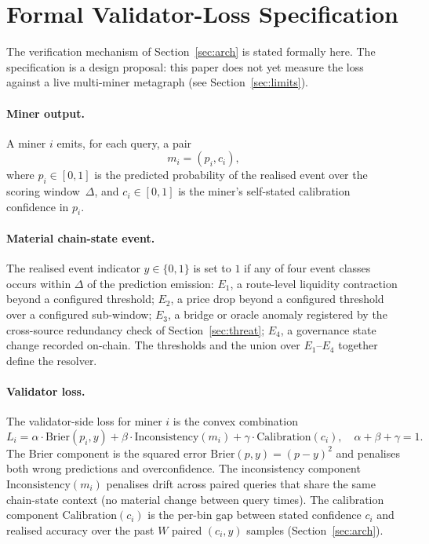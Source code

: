 \documentclass[11pt,a4paper]{article}
\begin{document}
\section{Formal Validator-Loss Specification}\label{sec:formal}\label{sec:formal:vloss}

The verification mechanism of Section~\ref{sec:arch} is stated formally
here. The specification is a design proposal: this paper does not yet
measure the loss against a live multi-miner metagraph (see
Section~\ref{sec:limits}).

\paragraph{Miner output.} A miner $i$ emits, for each query, a pair
\begin{equation}
m_i = (p_i, c_i),
\end{equation}
where $p_i \in [0,1]$ is the predicted probability of the realised event
over the scoring window~$\Delta$, and $c_i \in [0,1]$ is the miner's
self-stated calibration confidence in $p_i$.

\paragraph{Material chain-state event.} The realised event indicator
$y \in \{0,1\}$ is set to $1$ if any of four event classes occurs within
$\Delta$ of the prediction emission: $E_1$, a route-level liquidity
contraction beyond a configured threshold; $E_2$, a price drop beyond a
configured threshold over a configured sub-window; $E_3$, a bridge or
oracle anomaly registered by the cross-source redundancy check of
Section~\ref{sec:threat}; $E_4$, a governance state change recorded
on-chain. The thresholds and the union over $E_1$--$E_4$ together define
the resolver.

\paragraph{Validator loss.} The validator-side loss for miner $i$ is the
convex combination
\begin{equation}
L_i = \alpha \cdot \mathrm{Brier}(p_i, y) + \beta \cdot
\mathrm{Inconsistency}(m_i) + \gamma \cdot \mathrm{Calibration}(c_i),
\quad \alpha + \beta + \gamma = 1.
\end{equation}
The Brier component is the squared error
$\mathrm{Brier}(p, y) = (p - y)^2$ and penalises both wrong predictions
and overconfidence. The inconsistency component
$\mathrm{Inconsistency}(m_i)$ penalises drift across paired queries that
share the same chain-state context (no material change between query
times). The calibration component $\mathrm{Calibration}(c_i)$ is the
per-bin gap between stated confidence $c_i$ and realised accuracy over
the past $W$ paired $(c_i, y)$ samples (Section~\ref{sec:arch}).
\end{document}
